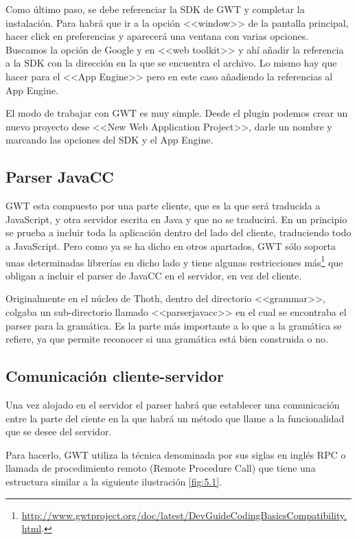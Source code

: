 Como último paso, se debe referenciar la SDK de GWT y completar la instalación. Para habrá que ir a la opción <<window>> de la pantalla principal, hacer click en preferencias y aparecerá una ventana con varias opciones. Buscamos la opción de Google y en <<web toolkit>> y ahí añadir la referencia a la SDK con la dirección en la que se encuentra el archivo. Lo mismo hay que hacer para el <<App Engine>> pero en este caso añadiendo la referencias al App Engine.

El modo de trabajar con GWT es muy simple. Desde el plugin podemos crear un nuevo proyecto dese <<New Web Application Project>>, darle un nombre y marcando las opciones del SDK y el App Engine.

 
\subsection{Parser JavaCC}

GWT esta compuesto por una parte cliente, que es la que será traducida a JavaScript, y otra servidor escrita en Java y que no se traducirá. En un principio se prueba a incluir toda la aplicación dentro del lado del cliente, traduciendo todo a JavaScript. Pero como ya se ha dicho en otros apartados, GWT sólo soporta unas determinadas librerías en dicho lado y tiene algunas restricciones más\footnote{\url{http://www.gwtproject.org/doc/latest/DevGuideCodingBasicsCompatibility.html}.} que obligan a incluir el parser de JavaCC en el servidor, en vez del cliente.

Originalmente en el núcleo de Thoth, dentro del directorio <<grammar>>, colgaba un sub-directorio llamado <<parserjavacc>> en el cual se encontraba el parser para la gramática. Es la parte más importante a lo que a la gramática se refiere, ya que permite reconocer si una gramática está bien construida o no.


\subsection{Comunicación cliente-servidor}
Una vez alojado en el servidor el parser habrá que establecer una comunicación entre la parte del ciente en la que habrá un método que llame a la funcionalidad que se desee del servidor.

Para hacerlo, GWT utiliza la técnica denominada por sus siglas en inglés RPC o llamada de procedimiento remoto (Remote Procedure Call) que tiene una estructura similar a la siguiente ilustración \ref{fig:5.1}.

